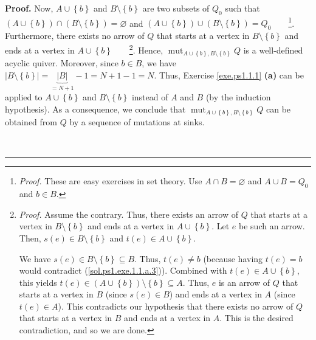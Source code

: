 \documentclass[numbers=enddot,12pt,final,onecolumn,notitlepage]{scrartcl}%
\newcounter{exer}
\numberwithin{exer}{section}
\theoremstyle{definition}
\newenvironment{proof}[1][Proof]{\noindent\textbf{#1.} }{\ \rule{0.5em}{0.5em}}
\begin{document}
\begin{proof}
Now, $A\cup\left\{  b\right\}  $ and $B\setminus\left\{  b\right\}  $ are two
subsets of $Q_{0}$ such that $\left(  A\cup\left\{  b\right\}  \right)
\cap\left(  B\setminus\left\{  b\right\}  \right)  =\varnothing$ and $\left(
A\cup\left\{  b\right\}  \right)  \cup\left(  B\setminus\left\{  b\right\}
\right)  =Q_{0}$\ \ \ \ \footnote{\textit{Proof.} These are easy exercises in
set theory. Use $A\cap B=\varnothing$ and $A\cup B=Q_{0}$ and $b\in B$.}.
Furthermore, there exists no arrow of $Q$ that starts at a vertex in
$B\setminus\left\{  b\right\}  $ and ends at a vertex in $A\cup\left\{
b\right\}  $\ \ \ \ \footnote{\textit{Proof.} Assume the contrary. Thus, there
exists an arrow of $Q$ that starts at a vertex in $B\setminus\left\{
b\right\}  $ and ends at a vertex in $A\cup\left\{  b\right\}  $. Let $e$ be
such an arrow. Then, $s\left(  e\right)  \in B\setminus\left\{  b\right\}  $
and $t\left(  e\right)  \in A\cup\left\{  b\right\}  $.
\par
We have $s\left(  e\right)  \in B\setminus\left\{  b\right\}  \subseteq B$.
Thus, $t\left(  e\right)  \neq b$ (because having $t\left(  e\right)  =b$
would contradict (\ref{sol.ps1.exe.1.1.a.3})). Combined with $t\left(
e\right)  \in A\cup\left\{  b\right\}  $, this yields $t\left(  e\right)
\in\left(  A\cup\left\{  b\right\}  \right)  \setminus\left\{  b\right\}
\subseteq A$. Thus, $e$ is an arrow of $Q$ that starts at a vertex in $B$
(since $s\left(  e\right)  \in B$) and ends at a vertex in $A$ (since
$t\left(  e\right)  \in A$). This contradicts our hypothesis that there exists
no arrow of $Q$ that starts at a vertex in $B$ and ends at a vertex in $A$.
This is the desired contradiction, and so we are done.}. Hence,
$\operatorname*{mut}\nolimits_{A\cup\left\{  b\right\}  ,B\setminus\left\{
b\right\}  }Q$ is a well-defined acyclic quiver. Moreover, since $b\in B$, we
have $\left\vert B\setminus\left\{  b\right\}  \right\vert
=\underbrace{\left\vert B\right\vert }_{=N+1}-1=N+1-1=N$. Thus, Exercise
\ref{exe.ps1.1.1} \textbf{(a)} can be applied to $A\cup\left\{  b\right\}  $
and $B\setminus\left\{  b\right\}  $ instead of $A$ and $B$ (by the induction
hypothesis). As a consequence, we conclude that $\operatorname*{mut}%
\nolimits_{A\cup\left\{  b\right\}  ,B\setminus\left\{  b\right\}  }Q$ can be
obtained from $Q$ by a sequence of mutations at sinks.


\end{proof}
\end{document}
